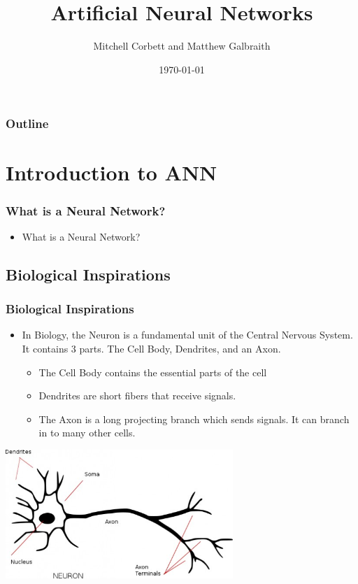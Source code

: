 \documentclass{beamer}
\title[Artifical Neural Networks]
{Artificial Neural Networks}
\subtitle{}
\date{\today}
\author[Mitchell Corbett/Matthew Galbraith]{Mitchell Corbett and Matthew Galbraith}
\begin{document}
 
 
\maketitle


\expandafter\def\expandafter\insertshorttitle\expandafter{%
  \insertshorttitle\hfill%
  \insertframenumber\,/\,\inserttotalframenumber}

\begin{frame}
  \frametitle{Outline}
  \tableofcontents[pausesections]
\end{frame}

\section{Introduction to ANN}
\begin{frame}
\frametitle{What is a Neural Network?}

\begin{itemize}
	\item What is a Neural Network?
    
\end{itemize}
\end{frame}
\subsection{Biological Inspirations}
\begin{frame}
\frametitle{Biological Inspirations}
\begin{itemize}
	\item In Biology, the Neuron is a fundamental unit of the Central Nervous System. It contains 3 parts. The Cell Body, Dendrites, and an Axon.
	\begin{itemize}
		\item The Cell Body contains the essential parts of the cell
		\item Dendrites are short fibers that receive signals.
		\item The Axon is a long projecting branch which sends signals. It can branch in to many other cells.
\end{itemize}
\end{itemize}
\end{frame}
\begin{frame}
\includegraphics[width = 325px]{neuron.jpg}
\end{frame}
\end{document}

